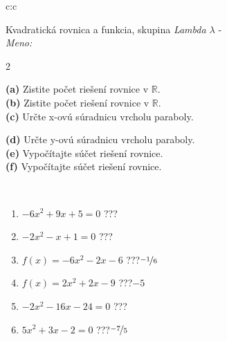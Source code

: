 \documentclass[10pt]{report}
\begin{document}
\begin{tabular}{c:c}
\begin{minipage}[c][104.5mm][t]{0.5\linewidth}
\begin{center}
\vspace{7mm}
{\huge {\LARGE Kvadratická rovnica a funkcia}, skupina \textit{Lambda $\lambda$} -}\\[5mm]
\textit{Meno:}\phantom{xxxxxxxxxxxxxxxxxxxxxxxxxxxxxxxxxxxxxxxxxxxxxxxxxxxxxxxxxxxxxxxxx}\\[5mm]
\begin{minipage}{0.95\linewidth}
\begin{center}
{\small \begin{multicols}{2} \raggedright
\textbf{(a)} Zistite počet riešení rovnice v \(\mathbb{R}\). \\[1mm]
\textbf{(b)} Zistite počet riešení rovnice v \(\mathbb{R}\). \\[1mm]
\textbf{(c)} Určte x-ovú súradnicu vrcholu paraboly. \par \columnbreak
\textbf{(d)} Určte y-ovú súradnicu vrcholu paraboly. \\[1mm]
\textbf{(e)} Vypočítajte súčet riešení rovnice. \\[1mm]
\textbf{(f)} Vypočítajte súčet riešení rovnice.
\end{multicols}
}
\end{center}
\end{minipage}
\\[4mm]
\begin{minipage}{0.79\linewidth}
\begin{center}
\begin{varwidth}{\linewidth}
\begin{enumerate}
\Large
\item $-6x^2+9x+5=0$\quad \dotfill\; ???\;\dotfill {}
\item $-2x^2-x+1=0$\quad \dotfill\; ???\;\dotfill {}
\item $f(x)=-6x^2-2x-6$\quad \dotfill\; ???\;\dotfill \quad $\nicefrac{-1}{6}$
\item $f(x)=2x^2+2x-9$\quad \dotfill\; ???\;\dotfill \quad $-5$
\item $-2x^2-16x-24=0$\quad \dotfill\; ???\;\dotfill {}
\item $5x^2+3x-2=0$\quad \dotfill\; ???\;\dotfill \quad $\nicefrac{-7}{5}$
\end{enumerate}
\end{varwidth}
\end{center}
\end{minipage}

\end{center}
\end{minipage}
\end{tabular}
\end{document}
